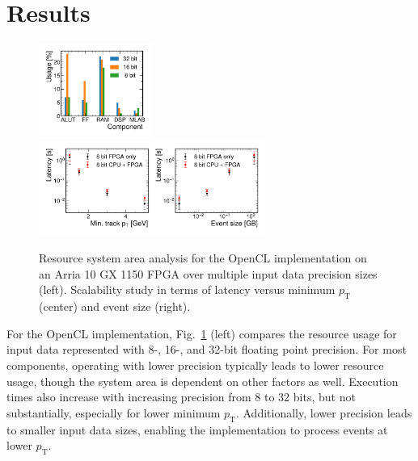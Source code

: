 \documentclass{article}
\newcommand{\pt}{\ensuremath{p_{\mathrm{T}}}\xspace}
\begin{document}
\section{Results}
\label{sec:results}

\begin{figure}[htpb]
    \centering
    \includegraphics[width=0.33\textwidth]{figures/resource_bit_precision_ocl.pdf}
    \includegraphics[width=0.66\textwidth]{figures/scalability_study_v2.pdf}
    \caption{Resource system area analysis for the OpenCL implementation on an Arria 10 GX 1150 FPGA over multiple input data precision sizes (left). 
    Scalability study in terms of latency versus minimum $\pt$ (center) and event size (right).}
    \label{fig:ocl_precision_scalability}
\end{figure}

For the OpenCL implementation, Fig.~\ref{fig:ocl_precision_scalability} (left) compares the resource usage for input data represented with 8-, 16-, and 32-bit floating point precision.
For most components, operating with lower precision typically leads to lower resource usage, though the system area is dependent on other factors as well.
Execution times also increase with increasing precision from 8 to 32 bits, but not substantially, especially for lower minimum $\pt$.
Additionally, lower precision leads to smaller input data sizes, enabling the implementation to process events at lower $\pt$.
\end{document}
